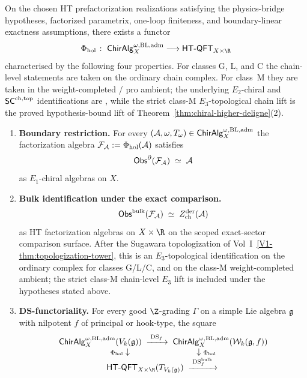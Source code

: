 \begin{theorem}
\label{thm:universal-holography-functor}
On the chosen HT prefactorization realizations satisfying the
physics-bridge hypotheses, factorized parametrix, one-loop finiteness,
and boundary-linear exactness assumptions, there exists a functor
\[
 \Phi_{\mathrm{hol}}
 \;\colon\;
 \ChirAlg^{\omega,\mathrm{BL,adm}}_X
 \longrightarrow
 \HTQFT_{X \times \R}
\]
characterised by the following four properties. For classes G, L, and
C the chain-level statements are taken on the ordinary chain complex.
For class~M they are taken in the weight-completed / pro ambient; the
underlying $E_2$-chiral and $\mathsf{SC}^{\mathrm{ch},\mathrm{top}}$ identifications are
 \ClaimStatusProvedHere, while the strict class-M $E_3$-topological
 chain lift is the proved hypothesis-bound lift of
 Theorem~\ref*{thm:chiral-higher-deligne}(2).
\begin{enumerate}[label=\textup{(\roman*)}]
\item \textbf{Boundary restriction.} For every
 $(\mathcal{A}, \omega, T_\omega) \in \mathsf{ChirAlg}^{\omega,\mathrm{BL,adm}}_X$ the
 factorization algebra $\mathcal{F}_{\mathcal{A}} := \Phi_{\mathrm{hol}}(\mathcal{A})$
 satisfies
 \[
 \mathsf{Obs}^\partial(\mathcal{F}_{\mathcal{A}}) \;\simeq\; \mathcal{A}
 \]
 as $E_1$-chiral algebras on $X$.
\item \textbf{Bulk identification under the exact comparison.}
 \[
 \mathsf{Obs}^{\mathrm{bulk}}(\mathcal{F}_{\mathcal{A}}) \;\simeq\; Z^{\mathrm{der}}_{\mathrm{ch}}(\mathcal{A})
 \]
 as HT factorization algebras on $X \times \R$ on the scoped
 exact-sector comparison surface. After the Sugawara
 topologization of Vol~I~\ref*{V1-thm:topologization-tower}, this is
	 an $E_3$-topological identification on the ordinary complex for
	 classes G/L/C, and on the class-M weight-completed ambient; the
	 strict class-M chain-level $E_3$ lift is included under the
	 hypotheses stated above.
\item \textbf{DS-functoriality.} For every good $\Z$-grading
 $\Gamma$ on a simple Lie algebra $\mathfrak{g}$ with nilpotent $f$ of
 principal or hook-type, the square
 \[
 \begin{array}{c}
 \ChirAlg^{\omega,\mathrm{BL,adm}}_X(V_k(\fg))
 \;\xrightarrow{\;\DS_f\;}\;
 \ChirAlg^{\omega,\mathrm{BL,adm}}_X(\cW_k(\fg, f))
 \\
 {\scriptstyle \Phi_{\mathrm{hol}}} \downarrow \qquad\qquad\qquad\qquad
 \downarrow {\scriptstyle \Phi_{\mathrm{hol}}}
 \\
 \HTQFT_{X \times \R}(T_{V_k(\fg)})
 \;\xrightarrow{\;\DS_f^{\mathrm{bulk}}\;}\;

\end{array}\]
\end{enumerate}
\end{theorem}
